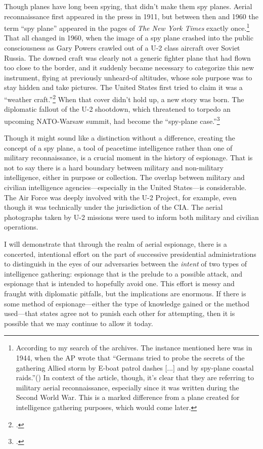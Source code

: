 \documentclass[12pt]{article}
\begin{document}
Though planes have long been spying, that didn't make them spy planes. Aerial reconnaissance first appeared in the press in 1911, but between then and 1960 the term ``spy plane'' appeared in the pages of \emph{The New York Times} exactly once.\footnote{According to my search of the archives. The instance mentioned here was in 1944, when the AP wrote that ``Germans tried to probe the secrets of the gathering Allied storm by E-boat patrol dashes [...] and by spy-plane coastal raids.''(\cite{the_associated_press_britons_1944}) In context of the article, though, it's clear that they are referring to military aerial reconnaissance, especially since it was written during the Second World War. This is a marked difference from a plane created for intelligence gathering purposes, which would come later.} That all changed in 1960, when the image of a spy plane crashed into the public consciousness as Gary Powers crawled out of a U-2 class aircraft over Soviet Russia. The downed craft was clearly not a generic fighter plane that had flown too close to the border, and it suddenly became necessary to categorize this new instrument, flying at previously unheard-of altitudes, whose sole purpose was to stay hidden and take pictures. The United States first tried to claim it was a ``weather craft.''\footcite{caruthers_soviet_1960} When that cover didn't hold up, a new story was born. The diplomatic fallout of the U-2 shootdown, which threatened to torpedo an upcoming NATO-Warsaw summit, had become the ``spy-plane case.''\footcite[This is the second time that ``spy plane'' as a term of art appeared in \emph{The New York Times}. There would be many more.]{reston_allies_1960}

Though it might sound like a distinction without a difference, creating the concept of a spy plane, a tool of peacetime intelligence rather than one of military reconnaissance, is a crucial moment in the history of espionage. That is not to say there is a hard boundary between military and non-military intelligence, either in purpose or collection. The overlap between military and civilian intelligence agencies---especially in the United States---is considerable. The Air Force was deeply involved with the U-2 Project, for example, even though it was technically under the jurisdiction of the CIA. The aerial photographs taken by U-2 missions were used to inform both military and civilian operations.

I will demonstrate that through the realm of aerial espionage, there is a concerted, intentional effort on the part of successive presidential administrations to distinguish in the eyes of our adversaries between the \emph{intent} of two types of intelligence gathering: espionage that is the prelude to a possible attack, and espionage that is intended to hopefully avoid one. This effort is messy and fraught with diplomatic pitfalls, but the implications are enormous. If there is some method of espionage---either the type of knowledge gained or the method used---that states agree not to punish each other for attempting, then it is possible that we may continue to allow it today.
\end{document}
